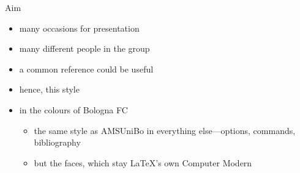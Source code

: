 \begin{frame}[c]{Aim}
%
\begin{itemize}
	\item many occasions for presentation
	\item many different people in the group
	\item a common reference could be useful
	\item hence, this style
	\item in the colours of Bologna FC
	\begin{itemize}
		\item the same style as \alert{AMSUniBo} in everything else---options, commands, bibliography
		\item but the faces, which stay \LaTeX{}'s own Computer Modern
	\end{itemize}
\end{itemize}
%
\end{frame}
